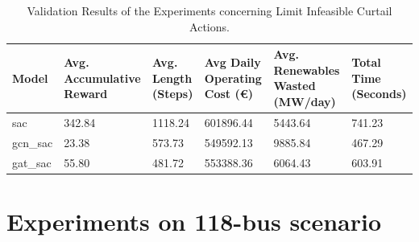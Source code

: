 	\begin{table}[ht]
		\centering
		\begin{tabularx}{\textwidth}{|l|X|X|X|X|X|}
			\hline
			\textbf{Model} & \textbf{Avg. Accumulative Reward}& \textbf{Avg. Length (Steps)} & \textbf{Avg Daily Operating Cost (€)} & \textbf{Avg. Renewables Wasted (MW/day)} & \textbf{Total Time (Seconds)}\\
			\hline
			sac & 342.84 & 1118.24 & 601896.44 & 5443.64 & 741.23 \\
			gcn\_sac & 23.38 & 573.73 & 549592.13 & 9885.84 & 467.29 \\
			gat\_sac & 55.80 & 481.72  & 553388.36 & 6064.43 & 603.91 \\
			\hline
		\end{tabularx}
		\caption{Validation Results of the Experiments concerning Limit Infeasible Curtail Actions.}
		\label{fig:curtail-val}
	\end{table}



\section{Experiments on 118-bus scenario}

